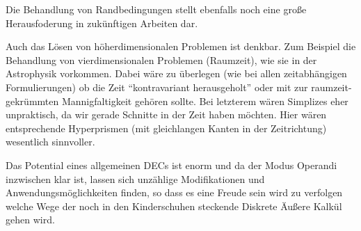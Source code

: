 Die Behandlung von Randbedingungen stellt ebenfalls noch eine große Herausfoderung in zukünftigen Arbeiten dar.

Auch das Lösen von höherdimensionalen Problemen ist denkbar.
Zum Beispiel die Behandlung von vierdimensionalen Problemen (Raumzeit), wie sie in der Astrophysik vorkommen.
Dabei wäre zu überlegen (wie bei allen zeitabhängigen Formulierungen) ob die Zeit "`kontravariant herausgeholt"' 
oder mit zur raumzeit-gekrümmten Mannigfaltigkeit gehören sollte. 
Bei letzterem wären Simplizes eher unpraktisch, da wir gerade Schnitte in der Zeit haben möchten. 
Hier wären entsprechende Hyperprismen (mit gleichlangen Kanten in der Zeitrichtung) wesentlich sinnvoller.

Das Potential eines allgemeinen DECs ist enorm und da der Modus Operandi inzwischen klar ist, lassen sich unzählige Modifikationen und
Anwendungsmöglichkeiten finden, so dass es eine Freude sein wird zu verfolgen welche Wege der noch in den Kinderschuhen steckende Diskrete
Äußere Kalkül gehen wird.
